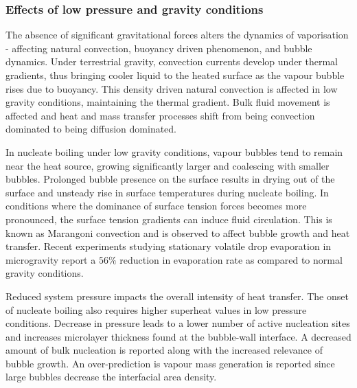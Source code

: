 \subsubsection{Effects of low pressure and gravity conditions}
The absence of significant gravitational forces alters the dynamics of vaporisation - affecting natural convection, buoyancy
driven phenomenon, and bubble dynamics. Under terrestrial gravity, convection currents develop under thermal
gradients, thus bringing cooler liquid to the heated surface as the vapour bubble rises due
to buoyancy. This density driven natural convection is affected in low gravity conditions, maintaining
the thermal gradient. Bulk fluid movement is affected and heat and mass transfer processes shift
from being convection dominated to being diffusion dominated.~\cite{cochranEffectsFluidProperties, leeExperimentalComputationalInvestigation2022}

In nucleate boiling under low gravity conditions, vapour bubbles tend to remain near the heat source, growing
significantly larger and coalescing with smaller bubbles. Prolonged bubble presence on the
surface results in drying out of the surface and unsteady rise in surface temperatures during nucleate boiling\cite{qiuSingleBubbleDynamicsPool2002}.
In conditions where the dominance of surface tension forces becomes more pronounced,
the surface tension gradients can induce fluid circulation. This is known as Marangoni
convection and is observed to affect bubble growth and heat transfer.
Recent experiments studying stationary volatile drop evaporation in microgravity
report a \(56\%\) reduction in evaporation rate as compared to normal gravity conditions.~\cite{xuNumericalStudyMarangoni2014, kumarSessileVolatileDrop2020}

Reduced system pressure impacts the overall intensity of heat transfer. The onset of nucleate boiling also
requires higher superheat values in low pressure conditions.
Decrease in pressure leads to a lower number of active nucleation sites and increases
microlayer thickness found at the bubble-wall interface. A decreased amount of
bulk nucleation is reported along with the increased relevance of bubble growth. 
An over-prediction is vapour mass generation is reported since large bubbles decrease
the interfacial area density.~\cite{serdyukovInfluencePressureLocal2023, zhangExperimentalTheoreticalStudy2002,liaoFlashingEvaporationDifferent2013}

